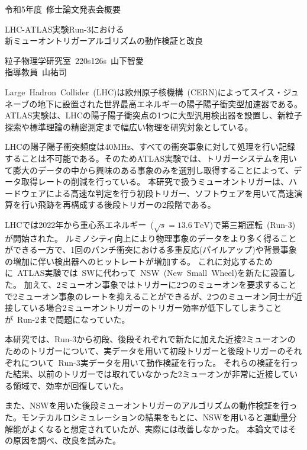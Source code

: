 \begin{center}
    \begin{large}
        令和5年度~修士論文発表会概要 
    \end{large}
\end{center}

\begin{center}
  \begin{Large}
     LHC-ATLAS実験Run-3における\\新ミューオントリガーアルゴリズムの動作検証と改良
  \end{Large}
\end{center}

\begin{flushright}
    粒子物理学研究室~220s126s~山下智愛 \\
    指導教員~山\ajTatsuSaki 祐司
\end{flushright}

\vspace{10pt}

Large~Hadron~Collider~(LHC)は欧州原子核機構~(CERN)によってスイス・ジュネーブの地下に設置された世界最高エネルギーの陽子陽子衝突型加速器である。ATLAS実験は、LHCの陽子陽子衝突点の1つに大型汎用検出器を設置し、新粒子探索や標準理論の精密測定まで幅広い物理を研究対象としている。

LHCの陽子陽子衝突頻度は40MHz、すべての衝突事象に対して処理を行い記録することは不可能である。そのためATLAS実験では、トリガーシステムを用いて膨大のデータの中から興味のある事象のみを選別し取得することによって、データ取得レートの削減を行っている。
本研究で扱うミューオントリガーは、ハードウェアによる高速な判定を行う初段トリガー、ソフトウェアを用いて高速演算を行い飛跡を再構成する後段トリガーの2段階である。

LHCでは2022年から重心系エネルギー~($\sqrt{s}=\SI{13.6}{\TeV}$)で第三期運転~(Run-3)が開始された。
ルミノシティ向上により物理事象のデータをより多く得ることができる一方で、1回のバンチ衝突における多重反応(パイルアップ)や背景事象の増加に伴い検出器へのヒットレートが増加する。
これに対応するために~ATLAS実験では~SWに代わって~NSW~(New~Small~Wheel)を新たに設置した。
加えて、2ミューオン事象ではトリガーに2つのミューオンを要求することで2ミューオン事象のレートを抑えることができるが、2つのミューオン同士が近接している場合2ミューオントリガーのトリガー効率が低下してしまうことが~Run-2まで問題になっていた。


本研究では、Run-3から初段、後段それぞれで新たに加えた近接2ミューオンのためのトリガーについて、実データを用いて初段トリガーと後段トリガーのそれぞれについて~Run-3実データを用いて動作検証を行った。
それらの検証を行った結果、以前のトリガーでは取れていなかった2ミューオンが非常に近接している領域で、効率が回復していた。

また、NSWを用いた後段ミューオントリガーのアルゴリズムの動作検証を行った。モンテカルロシミュレーションの結果をもとに、NSWを用いると運動量分解能がよくなると想定されていたが、実際には改善しなかった。
本論文ではその原因を調べ、改良を試みた。